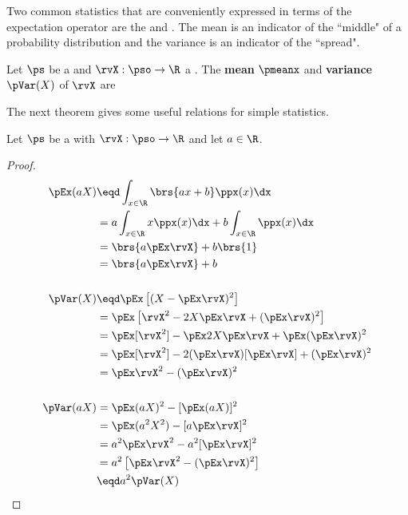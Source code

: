 Two common statistics that are conveniently expressed in terms of the
expectation operator are the  and .
The mean is an indicator of the ``middle" of a probability distribution and the
variance is an indicator of the ``spread".
\begin{definition}
\label{def:Mx}
Let $\ps$ be a  and $\rvX:\pso\to\R$ a .
The {\bf mean} $\pmeanx$ and {\bf variance} $\pVar(X)$ of $\rvX$ are
\end{definition}

The next theorem gives some useful relations for simple statistics.
\begin{theorem}
\label{thm:pE}
Let $\ps$ be a  with  $\rvX:\pso\to\R$
and let $a\in\R$.
\end{theorem}
\begin{proof}
\begin{align*}
  \pEx(aX)
    &\eqd \int_{x\in\R}\brs{ax+b} \ppx(x)  \dx
  \\&=    a \int_{x\in\R}x \ppx(x)  \dx + b\int_{x\in\R}\ppx(x)  \dx
  \\&= \brs{a\pEx\rvX} + b\brs{1}
  \\&= \brs{a\pEx\rvX} + b
\\
\\
  \pVar(X)
    &\eqd \pEx\left[(X-\pEx\rvX)^2\right]
  \\&=    \pEx\left[\rvX^2-2X\pEx\rvX + (\pEx\rvX)^2 \right]
  \\&=    \pEx[\rvX^2]  - \pEx 2X\pEx\rvX  + \pEx (\pEx\rvX)^2
  \\&=    \pEx[\rvX^2] - 2(\pEx\rvX)[\pEx\rvX] + (\pEx\rvX)^2
  \\&=    \pEx\rvX^2  - (\pEx\rvX)^2
\\
\\
  \pVar(aX)
    &=    \pEx(aX)^2  - [\pEx(aX)]^2
  \\&=    \pEx(a^2X^2)  - [a\pEx\rvX]^2
  \\&=    a^2 \pEx\rvX^2  - a^2[\pEx\rvX]^2
  \\&=    a^2\left[ \pEx\rvX^2  - (\pEx\rvX)^2 \right]
  \\&\eqd a^2 \pVar(X)
\end{align*}
\end{proof}

